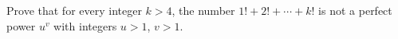 Prove that for every integer $k>4$, the number $1!+2!+\cdots+k!$ is not a perfect power $u^v$ with integers $u>1$, $v>1$.
